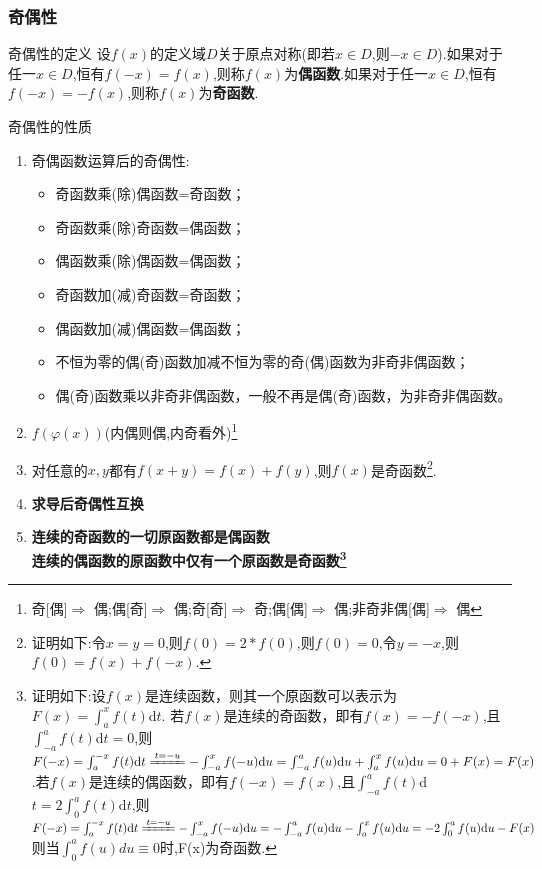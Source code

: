 \documentclass[8pt a4paper, oneside, UTF8]{ctexbook}  %
\begin{document}
\begin{sloppypar}
    \subsubsection{奇偶性}
    \begin{defn}{奇偶性的定义}{}
        设$f(x)$的定义域$D$关于原点对称(即若$x \in D$,则$-x \in D$).如果对于任一$x \in D$,恒有$f(-x)=f(x)$,则称$f(x)$为\textbf{偶函数}.如果对于任一$x \in D$,恒有$f(-x)=-f(x)$,则称$f(x)$为\textbf{奇函数}.
    \end{defn}
    \begin{criterion}{奇偶性的性质}{}\label{jox2}
        \begin{enumerate}
            \item 奇偶函数运算后的奇偶性:
            \begin{itemize}
                \item 奇函数乘(除)偶函数=奇函数；
                \item 奇函数乘(除)奇函数=偶函数；
                \item 偶函数乘(除)偶函数=偶函数；
                \item 奇函数加(减)奇函数=奇函数；
                \item 偶函数加(减)偶函数=偶函数；
                \item 不恒为零的偶(奇)函数加减不恒为零的奇(偶)函数为非奇非偶函数；
                \item 偶(奇)函数乘以非奇非偶函数，一般不再是偶(奇)函数，为非奇非偶函数。
            \end{itemize}
            \item $f(\varphi(x))$(内偶则偶,内奇看外)\footnote{
                  奇[偶]$\Rightarrow$ 偶;偶[奇]$\Rightarrow$ 偶;奇[奇]$\Rightarrow$ 奇;偶[偶]$\Rightarrow$ 偶;非奇非偶[偶]$\Rightarrow$ 偶}
            \item 对任意的$x,y$都有$f(x+y)=f(x)+f(y)$,则$f(x)$是奇函数\footnote{证明如下:令$x=y=0$,则$f(0)=2*f(0)$,则$f(0)=0$,令$y=-x$,则$f(0)=f(x)+f(-x).$}.
            \item \textbf{求导后奇偶性互换}
            \item \textbf{连续的奇函数的一切原函数都是偶函数}\\\textbf{连续的偶函数的原函数中仅有一个原函数是奇函数\footnote{证明如下:设$f(x)$是连续函数，则其一个原函数可以表示为$F( x) = \int _a^xf( t) $d$t.$ 若$f(x)$是连续的奇函数，即有$f(x)=-f(-x)$,且$\int _{- a}^af( t) $d$t= 0$,则$F(-x)=\int_a^{-x} f(t) \mathrm{d} t \xlongequal{t=-u}-\int_{-a}^x f(-u) \mathrm{d} u=\int_{-a}^a f(u) \mathrm{d} u+\int_a^x f(u) \mathrm{d} u=0+F(x)=F(x)$.若$f(x)$是连续的偶函数，即有$f(-x)=f(x)$,且$\int _{- a}^af( t) $d$t= 2\int _0^af( t) $d$t$,则$F(-x)=\int_a^{-x} f(t) \mathrm{d} t \xlongequal{t=-u}-\int_{-a}^x f(-u) \mathrm{d} u=-\int_{-a}^a f(u) \mathrm{d} u-\int_a^x f(u) \mathrm{d} u=-2 \int_0^a f(u) \mathrm{d} u-F(x)$则当$\int _0 ^a f(u)du \equiv 0$时,F(x)为奇函数.}}\label{jox1}

\end{enumerate}
\end{criterion}
\end{sloppypar}
\end{document}
